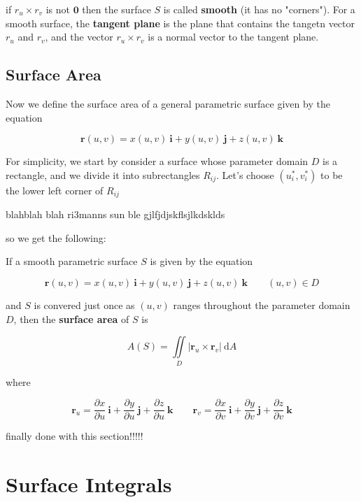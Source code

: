 \documentclass{article}
\begin{document}
if $r_u \times r_v $ is not $\mathbf{0 }$ then the surface $S$ is called \textbf{smooth} (it has no "corners"). For a smooth surface, the \textbf{tangent plane} is the plane that contains the tangetn vector $r_u$ and $r_v$, and the vector $r_u \times r_v$ is a normal vector to the tangent plane.

\subsection{Surface Area}

Now we define the surface area of a general parametric  surface given by the equation 

\begin{equation*}
    \mathbf{r}(u,v) = x(u,v) \ \mathbf{i} + y(u,v) \ \mathbf{j} + z(u,v) \ \mathbf{k}
\end{equation*}

For simplicity, we start by consider a surface whose parameter domain $D$ is a rectangle, and we divide it into subrectangles $R_{ij}$. Let's choose $(u_i^*, v_i^*)$ to be the lower left corner of $R_{ij}$

blahblah blah ri3manns sun ble gjlfjdjskflsjlkdsklds

so we get the following:

If a smooth parametric surface $S$ is given by the equation 

\begin{equation*}
    \mathbf{r}(u,v) = x(u,v) \ \mathbf{i} + y(u,v) \ \mathbf{j} + z(u,v) \ \mathbf{k} \qquad (u,v) \in D
\end{equation*}

and $S$ is convered just once as $(u,v)$ ranges throughout the parameter domain $D$, then the \textbf{surface area} of $S$ is 

\begin{equation*}
    A(S) = \iint\limits_{D} \rvert \mathbf{r}_u \times \mathbf{r}_v \rvert \ \mathrm{d} A
\end{equation*}

where 

\begin{equation*}
    \mathbf{r}_u = \frac{\partial x}{\partial u} \ \mathbf{i} + \frac{\partial y}{\partial u} \ \mathbf{j} + \frac{\partial z}{ \partial u} \ \mathbf{k} \qquad \mathbf{r}_v = \frac{\partial x}{\partial v} \ \mathbf{i} + \frac{\partial y}{\partial v} \ \mathbf{j} + \frac{\partial z}{ \partial v} \ \mathbf{k}
\end{equation*}

finally done with this section!!!!!



\newpage
\section{Surface Integrals}
\end{document}
